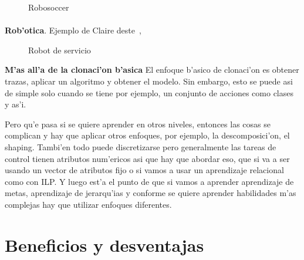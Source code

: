 \documentclass[11pt]{article}
\begin{document}
\begin{figure}[h]

\centering
{}
\caption[Robosoccer]{Robosoccer} 
\label{fig:robosoc}

\end{figure}


\paragraph{}
\noindent
\textbf{Rob'otica}. Ejemplo de Claire deste~\cite{deste:cloning}, %

\begin{figure}[h]
\begin{center}

\caption{Robot de servicio}
  \label{fig:robotservicio}
\end{center}
\end{figure} 


\medskip
\noindent

\textbf{M'as all'a de la clonaci'on b'asica}
El enfoque b'asico de clonaci'on es obtener trazas, aplicar un algoritmo y obtener el modelo. Sin embargo, esto se puede asi de simple solo cuando se tiene por ejemplo, un conjunto de acciones como clases y as'i. 

Pero qu'e pasa si se quiere aprender en otros niveles, entonces las cosas se complican y hay que aplicar otros enfoques, por ejemplo, la descomposici'on, el shaping. Tambi'en todo puede discretizarse pero generalmente las tareas de control tienen atributos num'ericos asi que hay que abordar eso, que si va a ser usando un vector de atributos fijo o si vamos a usar un aprendizaje relacional como con ILP. Y luego est'a el punto de que si vamos a aprender aprendizaje de metas, aprendizaje de jerarqu'ias y conforme se quiere aprender habilidades m'as complejas hay que utilizar enfoques diferentes.

\section{Beneficios y desventajas}
\end{document}
